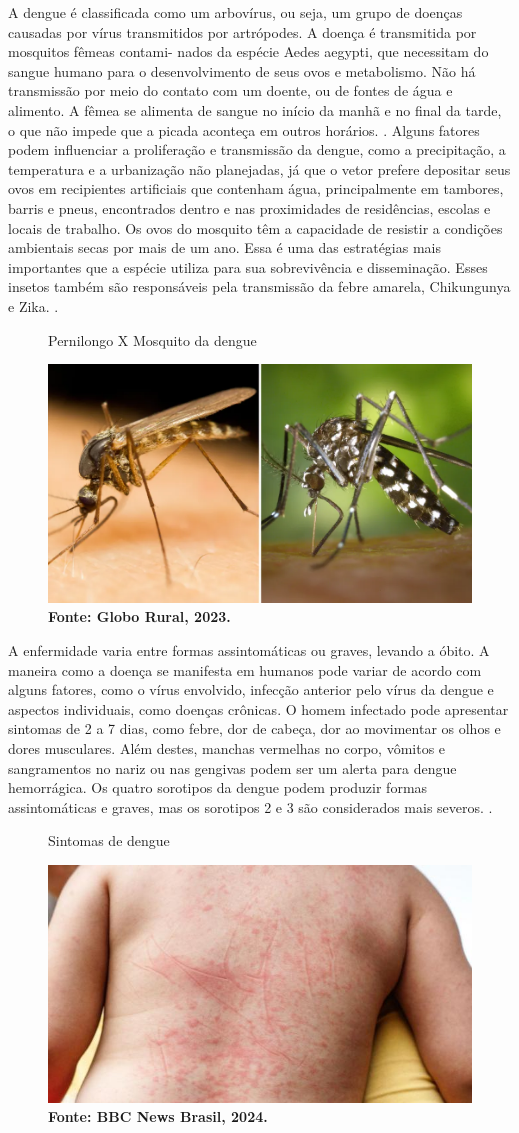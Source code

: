 A dengue é classificada como um arbovírus, ou seja, um grupo de doenças causadas por vírus transmitidos por artrópodes. A doença é transmitida por mosquitos fêmeas contami- nados da espécie Aedes aegypti, que necessitam do sangue humano para o desenvolvimento de seus ovos e metabolismo. Não há transmissão por meio do contato com um doente, ou de fontes de água e alimento. \cite{3} A fêmea se alimenta de sangue no início da manhã e no final da tarde, o que não impede que a picada aconteça em outros horários. \cite{5}. Alguns fatores podem influenciar a proliferação e transmissão da dengue, como a precipitação, a temperatura e a urbanização não planejadas, já que o vetor prefere depositar seus ovos em recipientes artificiais que contenham água, principalmente em tambores, barris e pneus, encontrados dentro e nas proximidades de residências, escolas e locais de trabalho. Os ovos do mosquito têm a capacidade de resistir a condições ambientais secas por mais de um ano. Essa é uma das estratégias mais importantes que a espécie utiliza para sua sobrevivência e disseminação. Esses insetos também são responsáveis pela transmissão da febre amarela, Chikungunya e Zika. \cite{6}.
\begin{figure}[H]
    \centering
    \caption{Pernilongo X Mosquito da dengue}
    \includegraphics[width=0.5\linewidth]{Illustrations/aedes.png}
    \caption*{\textbf{Fonte: Globo Rural, 2023.}}
    \label{fig:enter-label}
\end{figure}
A enfermidade varia entre formas assintomáticas ou graves, levando a óbito. A maneira como a doença se manifesta em humanos pode variar de acordo com alguns fatores, como o vírus envolvido, infecção anterior pelo vírus da dengue e aspectos individuais, como doenças crônicas. O homem infectado pode apresentar sintomas de 2 a 7 dias, como febre, dor de cabeça, dor ao movimentar os olhos e dores musculares. Além destes, manchas vermelhas no corpo, vômitos e sangramentos no nariz ou nas gengivas podem ser um alerta para dengue hemorrágica. Os quatro sorotipos da dengue podem produzir formas assintomáticas e graves, mas os sorotipos 2 e 3 são considerados mais severos. \cite{7}. 
\begin{figure}[H]
    \centering
    \caption{Sintomas de dengue}
    \includegraphics[width=0.5\linewidth]{Illustrations/sintomas.png}
    \caption*{\textbf{Fonte: BBC News Brasil, 2024.}}
    \label{fig:enter-label}
\end{figure}
